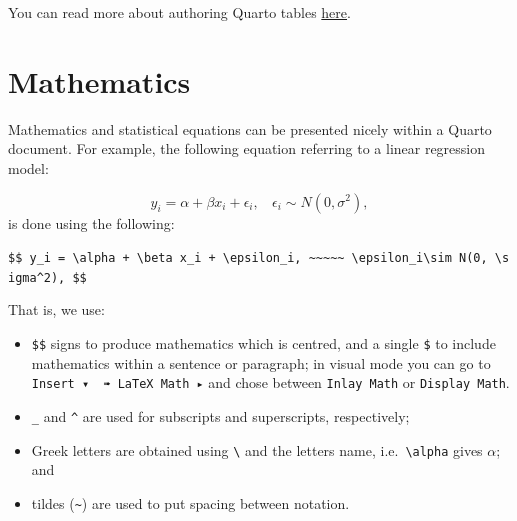 \documentclass[
  letterpaper,
  DIV=11,
  numbers=noendperiod]{scrartcl}
\providecommand{\tightlist}{%
  \setlength{\itemsep}{0pt}\setlength{\parskip}{0pt}}\usepackage{longtable,booktabs,array}
\begin{document}
\begin{tcolorbox}[enhanced jigsaw, colback=white, toprule=.15mm, arc=.35mm, colbacktitle=quarto-callout-note-color!10!white, titlerule=0mm, colframe=quarto-callout-note-color-frame, title=\textcolor{quarto-callout-note-color}{\faInfo}\hspace{0.5em}{Note}, bottomtitle=1mm, toptitle=1mm, coltitle=black, rightrule=.15mm, opacityback=0, bottomrule=.15mm, breakable, leftrule=.75mm, left=2mm, opacitybacktitle=0.6]

You can read more about authoring Quarto tables
\href{https://quarto.org/docs/authoring/figures.html}{here}.

\end{tcolorbox}

\hypertarget{mathematics}{%
\section{Mathematics}\label{mathematics}}

Mathematics and statistical equations can be presented nicely within a
Quarto document. For example, the following equation referring to a
linear regression model:

\[y_i = \alpha + \beta x_i + \epsilon_i, ~~~~ \epsilon_i \sim N(0, \sigma^2),\]
is done using the following:

\texttt{\$\$\ y\_i\ =\ \textbackslash{}alpha\ +\ \textbackslash{}beta\ x\_i\ +\ \textbackslash{}epsilon\_i,\ \textasciitilde{}\textasciitilde{}\textasciitilde{}\textasciitilde{}\textasciitilde{}\ \textbackslash{}\textasciigrave{}\textasciigrave{}epsilon\_i\textasciigrave{}\textasciigrave{}\textbackslash{}sim\ N(0,\ \textbackslash{}sigma\^{}2),\ \$\$}

That is, we use:

\begin{itemize}
\tightlist
\item
  \texttt{\$\$} signs to produce mathematics which is centred, and a
  single \texttt{\$} to include mathematics within a sentence or
  paragraph; in visual mode you can go to
  \texttt{Insert\ ▾\ \ ➠\ LaTeX\ Math\ ▸} and chose between
  \texttt{Inlay\ Math} or \texttt{Display\ Math}.
\item
  \texttt{\_} and \texttt{\^{}} are used for subscripts and
  superscripts, respectively;
\item
  Greek letters are obtained using \texttt{\textbackslash{}} and the
  letters name, i.e.~\texttt{\textbackslash{}alpha} gives \(\alpha\);
  and
\item
  tildes (\texttt{\textasciitilde{}}) are used to put spacing between
  notation.
\end{itemize}
\end{document}
